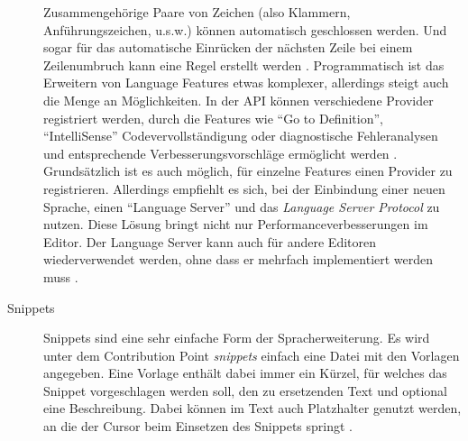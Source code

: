 \begin{description}
      Zusammengehörige Paare von Zeichen (also Klammern, Anführungszeichen, u.s.w.) können automatisch geschlossen werden.
      Und sogar für das automatische Einrücken der nächsten Zeile bei einem Zeilenumbruch kann eine Regel erstellt werden
      \cite{VSCodeExtensionAPILanguageConfigurationGuide}.
      Programmatisch ist das Erweitern von Language Features etwas komplexer, allerdings steigt auch die
      Menge an Möglichkeiten. In der API können verschiedene Provider registriert werden, durch die Features wie
      \enquote{Go to Definition}, \enquote{IntelliSense} Codevervollständigung oder diagnostische Fehleranalysen und
      entsprechende Verbesserungsvorschläge ermöglicht werden
      \cite{VSCodeExtensionAPIProgrammaticLanguageFeatures}. 
      Grundsätzlich ist es auch möglich, für einzelne
      Features einen Provider zu registrieren. Allerdings empfiehlt es sich, bei der Einbindung einer neuen
      Sprache, einen \enquote{Language Server} und das \emph{Language Server Protocol} zu nutzen. Diese Lösung
      bringt nicht nur Performanceverbesserungen im Editor. Der Language Server kann auch für 
      andere Editoren wiederverwendet werden, ohne dass er mehrfach implementiert werden muss \cite{GunasingheNadeeshaan2022Lspa,LSPHomepage}.
    \item[Snippets] 
      Snippets sind eine sehr einfache Form der Spracherweiterung. Es wird unter dem Contribution Point
      \emph{snippets} einfach eine Datei mit den Vorlagen angegeben. Eine Vorlage enthält dabei immer
      ein Kürzel, für welches das Snippet vorgeschlagen werden soll, den zu ersetzenden Text und optional
      eine Beschreibung. Dabei können im Text auch Platzhalter genutzt werden, an die der Cursor beim Einsetzen
      des Snippets springt
      \cite{VSCodeExtensionAPISnippetGuide}.
  \end{description}
